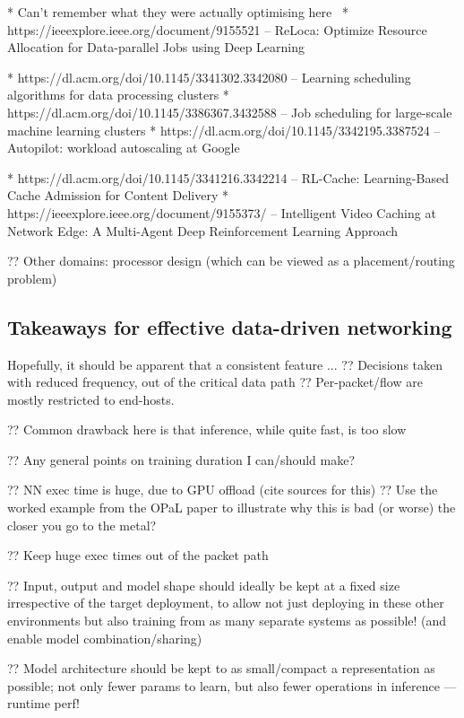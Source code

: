 * Can't remember what they were actually optimising here~\parencite{DBLP:conf/hotnets/MaoAMK16}
* https://ieeexplore.ieee.org/document/9155521 -- ReLoca: Optimize Resource Allocation for Data-parallel Jobs using Deep Learning

* https://dl.acm.org/doi/10.1145/3341302.3342080 -- Learning scheduling algorithms for data processing clusters
* https://dl.acm.org/doi/10.1145/3386367.3432588 -- Job scheduling for large-scale machine learning clusters
* https://dl.acm.org/doi/10.1145/3342195.3387524 -- Autopilot: workload autoscaling at Google

* https://dl.acm.org/doi/10.1145/3341216.3342214 -- RL-Cache: Learning-Based Cache Admission for Content Delivery
* https://ieeexplore.ieee.org/document/9155373/ -- Intelligent Video Caching at Network Edge: A Multi-Agent Deep Reinforcement Learning Approach

?? Other domains: processor design (which can be viewed as a placement/routing problem)~\parencite{Mirhoseini2021}

\subsection{Takeaways for effective data-driven networking}\label{sec:ddn-use-takeaways}

Hopefully, it should be apparent that a consistent feature ...
?? Decisions taken with reduced frequency, out of the critical data path
?? Per-packet/flow are mostly restricted to end-hosts.

?? Common drawback here is that inference, while quite fast, is too slow 

?? Any general points on training duration I can/should make?

?? NN exec time is huge, due to GPU offload (cite sources for this)
?? Use the worked example from the OPaL paper to illustrate why this is bad (or worse) the closer you go to the metal?

?? Keep huge exec times out of the packet path

?? Input, output and model shape should ideally be kept at a fixed size irrespective of the target deployment, to allow not just deploying in these other environments but also training from as many separate systems as possible! (and enable model combination/sharing)

?? Model architecture should be kept to as small/compact a representation as possible; not only fewer params to learn, but also fewer operations in inference --- runtime perf!

